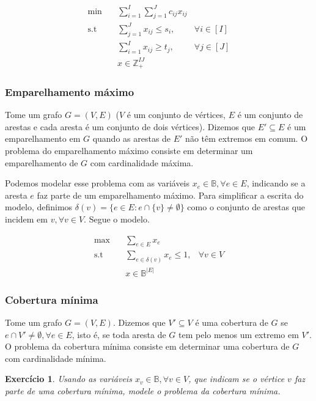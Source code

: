 \documentclass[]{article}
\newtheorem{exercicio}{Exercício}
\numberwithin{equation}{section}
\begin{document}
\begin{align}
\min        &\quad  \sum_{i = 1}^I \sum_{j = 1}^J c_{ij} x_{ij} \\
\text{s.t}  &\quad  \sum_{j = 1}^J x_{ij} \leq s_i, & \forall i \in [I] \\
            &\quad  \sum_{i = 1}^I x_{ij} \geq t_j, & \forall j \in [J] \\
            &\quad  x \in \mathbb{Z}_+^{IJ}
\end{align}

\subsubsection{Emparelhamento máximo}

Tome um grafo $G = (V, E)$ ($V$ é um conjunto de vértices, $E$ é um conjunto de arestas e cada aresta
é um conjunto de dois vértices).
Dizemos que $E' \subseteq E$ é um emparelhamento em $G$ quando as arestas de $E'$ não têm extremos em comum.
O problema do emparelhamento máximo consiste em determinar um emparelhamento de $G$ com cardinalidade
máxima.

Podemos modelar esse problema com as variáveis $x_e \in \mathbb{B}, \forall e \in E$, indicando se a
aresta $e$ faz parte de um emparelhamento máximo.
Para simplificar a escrita do modelo, definimos
$\delta(v) = \{e \in E : e \cap \{v\} \neq \emptyset\}$
como o conjunto de arestas que incidem em $v, \forall v \in V$.
Segue o modelo.

\begin{align}
\max        &\quad  \sum_{e \in E} x_e \\
\text{s.t}  &\quad  \sum_{e \in \delta(v)} x_e \leq 1, & \forall v \in V \\
            &\quad  x \in \mathbb{B}^{|E|}
\end{align}

\subsubsection{Cobertura mínima}

Tome um grafo $G = (V, E)$.
Dizemos que $V' \subseteq V$ é uma cobertura de $G$ se $e \cap V' \neq \emptyset, \forall e \in E$,
isto é, se toda aresta de $G$ tem pelo menos um extremo em $V'$.
O problema da cobertura mínima consiste em determinar uma cobertura de $G$ com cardinalidade mínima.

\begin{exercicio}
  Usando as variáveis $x_v \in \mathbb{B}, \forall v \in V$, que indicam se o vértice $v$ faz parte
  de uma cobertura mínima, modele o problema da cobertura mínima.
\end{exercicio}
\end{document}
